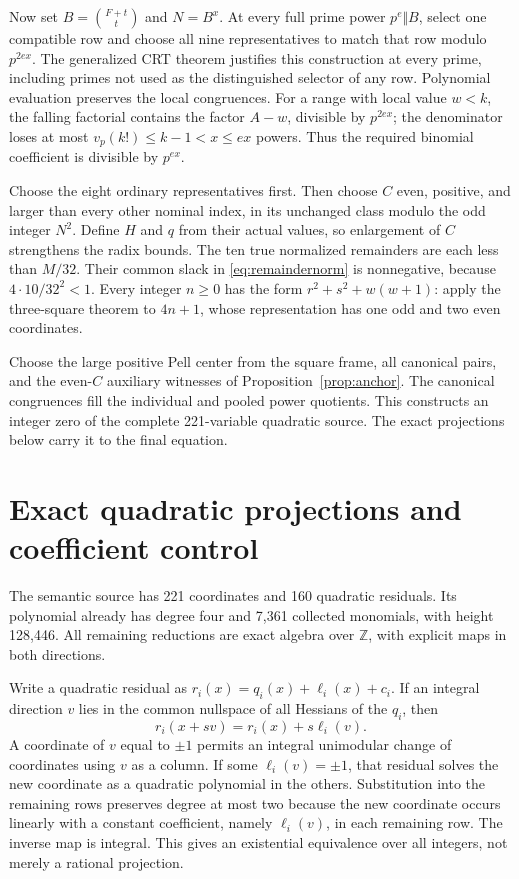 \documentclass[11pt]{article}
\theoremstyle{definition}\newtheorem{remark}[theorem]{Remark}
\newcommand{\Z}{\mathbb Z}\newcommand{\N}{\mathbb N}\newcommand{\Q}{\mathbb Q}
\begin{document}
Now set $B=\binom{F+t}{t}$ and $N=B^x$. At every full prime power
$p^e\Vert B$, select one compatible row and choose all nine
representatives to match that row modulo $p^{2ex}$. The generalized CRT
theorem justifies this construction at every prime, including primes not
used as the distinguished selector of any row. Polynomial evaluation
preserves the local congruences. For a range with local value $w<k$,
the falling factorial contains the factor $A-w$, divisible by $p^{2ex}$;
the denominator loses at most $v_p(k!)\le k-1<x\le ex$ powers.
Thus the required binomial coefficient is divisible by $p^{ex}$.

Choose the eight ordinary representatives first. Then choose $C$ even,
positive, and larger than every other nominal index, in its unchanged
class modulo the odd integer $N^2$. Define $H$ and $q$ from their actual
values, so enlargement of $C$ strengthens the radix bounds. The ten true
normalized remainders are each less than $M/32$. Their common slack in
\eqref{eq:remaindernorm} is nonnegative, because
$4\cdot10/32^2<1$. Every integer $n\ge0$ has the form
$r^2+s^2+w(w+1)$: apply the three-square theorem to $4n+1$,
whose representation has one odd and two even coordinates.

Choose the large positive Pell center from the square frame, all canonical
pairs, and the even-$C$ auxiliary witnesses of Proposition~\ref{prop:anchor}.
The canonical congruences fill the individual and pooled power quotients.
This constructs an integer zero of the complete 221-variable quadratic
source. The exact projections below carry it to the final equation.

\section{Exact quadratic projections and coefficient control}

The semantic source has 221 coordinates and 160 quadratic residuals.
Its polynomial already has degree four and 7,361 collected monomials,
with height 128,446. All remaining reductions are exact algebra over
$\Z$, with explicit maps in both directions.

Write a quadratic residual as $r_i(x)=q_i(x)+\ell_i(x)+c_i$.
If an integral direction $v$ lies in the common nullspace of all Hessians
of the $q_i$, then
\[
 r_i(x+sv)=r_i(x)+s\ell_i(v).
\]
A coordinate of $v$ equal to $\pm1$ permits an integral unimodular
change of coordinates using $v$ as a column. If some $\ell_i(v)=\pm1$,
that residual solves the new coordinate as a quadratic polynomial in
the others. Substitution into the remaining rows preserves degree at
most two because the new coordinate occurs linearly with a constant
coefficient, namely $\ell_i(v)$, in each remaining row.
The inverse map is integral. This gives an existential equivalence over
all integers, not merely a rational projection.
\end{document}
